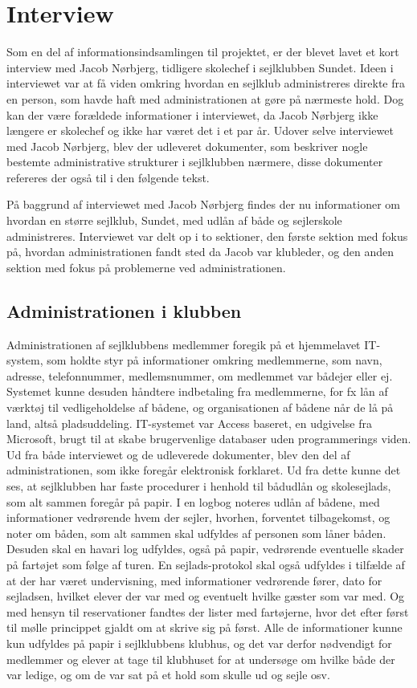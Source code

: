 \chapter{Interview}\label{bilag:interview}
Som en del af informationsindsamlingen til projektet, er der blevet lavet et kort interview med Jacob Nørbjerg, tidligere skolechef i sejlklubben Sundet. Ideen i interviewet var at få viden omkring hvordan en sejlklub administreres direkte fra en person, som havde haft med administrationen at gøre på nærmeste hold. Dog kan der være forældede informationer i interviewet, da Jacob Nørbjerg ikke længere er skolechef og ikke har været det i et par år. Udover selve interviewet med Jacob Nørbjerg, blev der udleveret dokumenter, som beskriver nogle bestemte administrative strukturer i sejlklubben nærmere, disse dokumenter refereres der også til i den følgende tekst.

På baggrund af interviewet med Jacob Nørbjerg findes der nu informationer om hvordan en større sejlklub, Sundet, med udlån af både og sejlerskole administreres. Interviewet var delt op i to sektioner, den første sektion med fokus på, hvordan administrationen fandt sted da Jacob var klubleder, og den anden sektion med fokus på problemerne ved administrationen.
\section*{Administrationen i klubben}
Administrationen af sejlklubbens medlemmer foregik på et hjemmelavet IT-system, som holdte styr på informationer omkring medlemmerne, som navn, adresse, telefonnummer, medlemsnummer, om medlemmet var bådejer eller ej. Systemet kunne desuden håndtere indbetaling fra medlemmerne, for fx lån af værktøj til vedligeholdelse af bådene, og organisationen af bådene når de lå på land, altså pladsuddeling. IT-systemet var Access baseret, en udgivelse fra Microsoft, brugt til at skabe brugervenlige databaser uden programmerings viden.
Ud fra både interviewet og de udleverede dokumenter, blev den del af administrationen, som ikke foregår elektronisk forklaret. Ud fra dette kunne det ses, at sejlklubben har faste procedurer i henhold til bådudlån og skolesejlads, som alt sammen foregår på papir. I en logbog noteres udlån af bådene, med informationer vedrørende hvem der sejler, hvorhen, forventet tilbagekomst, og noter om båden, som alt sammen skal udfyldes af personen som låner båden. Desuden skal en havari log udfyldes, også på papir, vedrørende eventuelle skader på fartøjet som følge af turen. En sejlads-protokol skal også udfyldes i tilfælde af at der har været undervisning, med informationer vedrørende fører, dato for sejladsen, hvilket elever der var med og eventuelt hvilke gæster som var med. Og med hensyn til reservationer fandtes der lister med fartøjerne, hvor det efter først til mølle princippet gjaldt om at skrive sig på først. Alle de informationer kunne kun udfyldes på papir i sejlklubbens klubhus, og det var derfor nødvendigt for medlemmer og elever at tage til klubhuset for at undersøge om hvilke både der var ledige, og om de var sat på et hold som skulle ud og sejle osv. 
